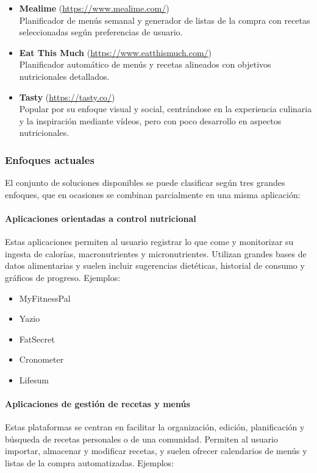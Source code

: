 \begin{itemize}
	\item \textbf{Mealime} (\url{https://www.mealime.com/})\\
	      Planificador de menús semanal y generador de listas de la compra con recetas seleccionadas según preferencias de usuario.

	\item \textbf{Eat This Much} (\url{https://www.eatthismuch.com/})\\
	      Planificador automático de menús y recetas alineados con objetivos nutricionales detallados.

	\item \textbf{Tasty} (\url{https://tasty.co/})\\
	      Popular por su enfoque visual y social, centrándose en la experiencia culinaria y la inspiración mediante vídeos, pero con poco desarrollo en aspectos nutricionales.
\end{itemize}


\subsubsection*{Enfoques actuales}

El conjunto de soluciones disponibles se puede clasificar según tres grandes enfoques, que en ocasiones se combinan parcialmente en una misma aplicación:


\paragraph*{Aplicaciones orientadas a control nutricional}
Estas aplicaciones permiten al usuario registrar lo que come y monitorizar su ingesta de calorías, macronutrientes y micronutrientes. Utilizan grandes bases de datos alimentarias y suelen incluir sugerencias dietéticas, historial de consumo y gráficos de progreso. Ejemplos:

\begin{itemize}
	\item MyFitnessPal
	\item Yazio
	\item FatSecret
	\item Cronometer
	\item Lifesum
\end{itemize}

\paragraph*{Aplicaciones de gestión de recetas y menús}
Estas plataformas se centran en facilitar la organización, edición, planificación y búsqueda de recetas personales o de una comunidad. Permiten al usuario importar, almacenar y modificar recetas, y suelen ofrecer calendarios de menús y listas de la compra automatizadas. Ejemplos:

